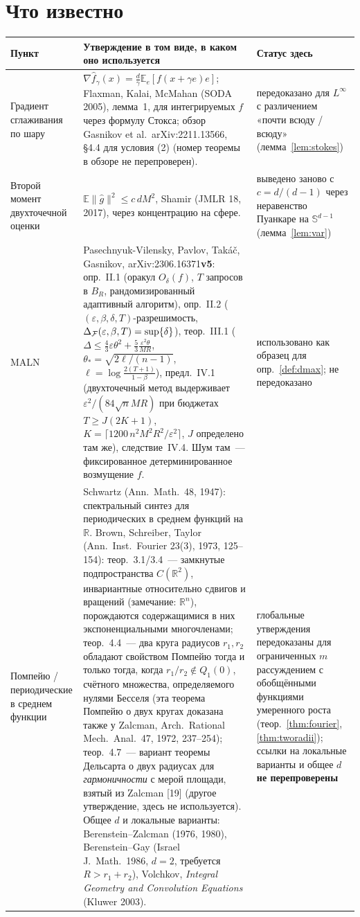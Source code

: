 \documentclass[11pt,a4paper]{article}
\numberwithin{equation}{section}
\theoremstyle{definition}
\theoremstyle{remark}
\newcommand{\E}{\mathbb E}\newcommand{\R}{\mathbb R}\newcommand{\N}{\mathbb N}\let\Prob\relax\newcommand{\Prob}{\mathbb P}
\newcommand{\norm}[1]{\lVert #1\rVert}\newcommand{\abs}[1]{\lvert #1\rvert}\newcommand{\ip}[2]{\langle #1,#2\rangle}
\newcommand{\Sph}{\mathbb S^{d-1}}\newcommand{\Ball}{\mathbb B}
\begin{document}
\section{Что известно}\label{sec:known}
{\small
\begin{xltabular}{\textwidth}{@{}p{3.3cm}Xp{2.6cm}@{}}
\toprule
\textbf{Пункт} & \textbf{Утверждение в том виде, в каком оно используется} & \textbf{Статус здесь}\\\midrule
\endhead
Градиент сглаживания по шару & $\nabla\hat f_\gamma(x)=\frac d\gamma\E_e[f(x+\gamma e)e]$; Flaxman, Kalai, McMahan (SODA 2005), лемма~1, для интегрируемых $f$ через формулу Стокса; обзор Gasnikov et al.\ arXiv:2211.13566, \S4.4 для условия (2) (номер теоремы в обзоре не перепроверен). & передоказано для $L^\infty$ с различением «почти всюду / всюду» (лемма~\ref{lem:stokes}) \\
Второй момент двухточечной оценки & $\E\norm{\hat g}^2\le c\,dM^2$, Shamir (JMLR 18, 2017), через концентрацию на сфере. & выведено заново с $c=d/(d-1)$ через неравенство Пуанкаре на $\Sph$ (лемма~\ref{lem:var}) \\
MALN & Pasechnyuk-Vilensky, Pavlov, Takáč, Gasnikov, arXiv:2306.16371\textbf{v5}: опр.~II.1 (оракул $O_\delta(f)$, $T$ запросов в $B_R$, рандомизированный адаптивный алгоритм), опр.~II.2 ($(\varepsilon,\beta,\delta,T)$-разрешимость, $\Delta_\mathcal F(\varepsilon,\beta,T)=\sup\{\delta\}$), теор.~III.1 ($\Delta\le\frac43\varepsilon\theta^2+\frac53\frac{\varepsilon^2\theta}{MR}$, $\theta_*=\sqrt{2\ell/(n-1)}$, $\ell=\log\frac{2(T+1)}{1-\beta}$), предл.~IV.1 (двухточечный метод выдерживает $\varepsilon^2/(84\sqrt nMR)$ при бюджетах $T\ge J(2K+1)$, $K=\lceil1200\,n^2M^2R^2/\varepsilon^2\rceil$, $J$ определено там же), следствие~IV.4. Шум там~--- фиксированное детерминированное возмущение $f$. & использовано как образец для опр.~\ref{def:dmax}; не передоказано \\
Помпейю / периодические в среднем функции & Schwartz (Ann.\ Math.\ 48, 1947): спектральный синтез для периодических в среднем функций на $\R$. Brown, Schreiber, Taylor (Ann.\ Inst.\ Fourier 23(3), 1973, 125--154): теор.~3.1/3.4~--- замкнутые подпространства $C(\R^2)$, инвариантные относительно сдвигов и вращений (замечание: $\R^n$), порождаются содержащимися в них экспоненциальными многочленами; теор.~4.4~--- два круга радиусов $r_1,r_2$ обладают свойством Помпейю тогда и только тогда, когда $r_1/r_2\notin Q_1(0)$, счётного множества, определяемого нулями Бесселя (эта теорема Помпейю о двух кругах доказана также у Zalcman, Arch.\ Rational Mech.\ Anal.\ 47, 1972, 237--254); теор.~4.7~--- вариант теоремы Дельсарта о двух радиусах для \emph{гармоничности} с мерой площади, взятый из Zalcman [19] (другое утверждение, здесь не используется). Общее $d$ и локальные варианты: Berenstein--Zalcman (1976, 1980), Berenstein--Gay (Israel J.\ Math.\ 1986, $d=2$, требуется $R>r_1+r_2$), Volchkov, \emph{Integral Geometry and Convolution Equations} (Kluwer 2003). & глобальные утверждения передоказаны для ограниченных $m$ рассуждением с обобщёнными функциями умеренного роста (теор.~\ref{thm:fourier}, \ref{thm:tworadii}); ссылки на локальные варианты и общее $d$ \textbf{не перепроверены} \\

\end{xltabular}}
\end{document}
